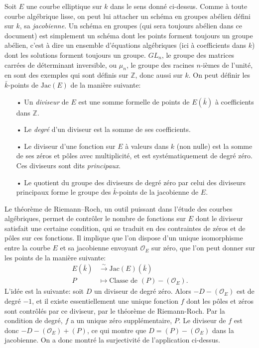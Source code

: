 \documentclass[11pt,a4paper]{article}
\newcommand{\Z}{\mathbb{Z}}
\renewcommand{\O}{\mathcal{O}}
\newcommand{\vers}{\longrightarrow}
\newcommand{\Jac}{\mathrm{Jac}}
\theoremstyle{definition}
\begin{document}
Soit $E$ une courbe elliptique sur $k$ dans le sens donné ci-dessus. Comme à toute courbe algébrique lisse, on peut lui attacher un schéma en groupes abélien défini sur $k$, sa \emph{jacobienne}. Un schéma en groupes (qui sera toujours abélien dans ce document) est simplement un schéma dont les points forment toujours un groupe abélien, c'est à dire un ensemble d'équations algébriques (ici à coefficients dans $k$) dont les solutions forment toujours un groupe. $GL_n$, le groupe des matrices carrées de déterminant inversible, ou $\mu_n$, le groupe des racines $n$-ièmes de l'unité, en sont des exemples qui sont définis sur $\Z$, donc aussi sur $k$. On peut définir les $\bar{k}$-points de $\Jac(E)$ de la manière suivante:
\begin{itemize}
\item[•] Un \emph{diviseur} de $E$ est une somme formelle de points de $E(\bar{k})$ à coefficients dans $\Z$.
\item[•] Le \emph{degré} d'un diviseur est la somme de ses coefficients.
\item[•] Le diviseur d'une fonction sur $E$ à valeurs dans $k$ (non nulle) est la somme de ses zéros et pôles avec multiplicité, et est systématiquement de degré zéro. Ces diviseurs sont dits \emph{principaux}.
\item[•] Le quotient du groupe des diviseurs de degré zéro par celui des diviseurs principaux forme le groupe des $\bar{k}$-points de la jacobienne de $E$.
\end{itemize}
Le théorème de Riemann--Roch, un outil puissant dans l'étude des courbes algébriques, permet de contrôler le nombre de fonctions sur $E$ dont le diviseur satisfait une certaine condition, qui se traduit en des contraintes de zéros et de pôles sur ces fonctions. Il implique que l'on dispose d'un unique isomorphisme entre la courbe $E$ et sa jacobienne envoyant $\O_E$ sur zéro, que l'on peut donner sur les points de la manière suivante:
$$\begin{aligned}
E(\bar{k}) &\overset{\sim}{\vers} \Jac(E)(\bar{k}) \\
P &\longmapsto \text{Classe de } (P) - (\O_E).
\end{aligned}$$
L'idée est la suivante: soit $D$ un diviseur de degré zéro. Alors $-D - (\O_E)$ est de degré $-1$, et il existe essentiellement une unique fonction $f$ dont les pôles et zéros sont contrôlés par ce diviseur, par le théorème de Riemann-Roch. Par la condition de degré, $f$ a un unique zéro supplémentaire, $P$. Le diviseur de $f$ est donc $- D - (\O_E) + (P)$, ce qui montre que $D = (P) - (\O_E)$ dans la jacobienne. On a donc montré la surjectivité de l'application ci-dessus.
\end{document}
